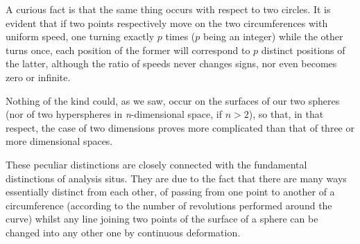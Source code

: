 \documentclass[12pt,oneside]{book}
\begin{document}

A curious fact is that the same thing occurs with respect to two circles. It is
evident that if two points respectively move on the two circumferences with
uniform speed, one turning exactly $p$ times ($p$ being an integer) while the
other turns once, each position of the former will correspond to $p$ distinct
positions of the latter, although the ratio of speeds never changes signs, nor
even becomes zero or infinite. \par

Nothing of the kind could, as we saw, occur on the surfaces of our two spheres
(nor of two hyperspheres in \textit{n}-dimensional space, if $n>2$), so that, in
that respect, the case of two dimensions proves more complicated than that of
three or more dimensional spaces. \par

These peculiar distinctions are closely connected with the fundamental
distinctions of analysis situs. They are due to the fact that there are many
ways essentially distinct from each other, of passing from one point to another
of a circumference (according to the number of revolutions performed around the
curve) whilst any line joining two points of the surface of a sphere can be
changed into any other one by continuous deformation. \par
\end{document}
